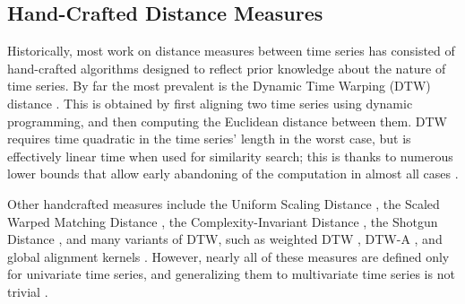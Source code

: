 

\subsection{Hand-Crafted Distance Measures}

Historically, most work on distance measures between time series has consisted of hand-crafted algorithms designed to reflect prior knowledge about the nature of time series. By far the most prevalent is the Dynamic Time Warping (DTW) distance \citep{dtw}. This is obtained by first aligning two time series using dynamic programming, and then computing the Euclidean distance between them. DTW requires time quadratic in the time series' length in the worst case, but is effectively linear time when used for similarity search; this is thanks to numerous lower bounds that allow early abandoning of the computation in almost all cases \citep{ucrSuite}.

Other handcrafted measures include the Uniform Scaling Distance \citep{originalUS}, the Scaled Warped Matching Distance \citep{swm}, the Complexity-Invariant Distance \citep{cid}, the Shotgun Distance \citep{shotgunDistance}, and many variants of DTW, such as weighted DTW \citep{weightedDTW}, DTW-A \citep{nontrivial}, and global alignment kernels \citep{gak}. However, nearly all of these measures are defined only for univariate time series, and generalizing them to multivariate time series is not trivial \citep{nontrivial}. %




